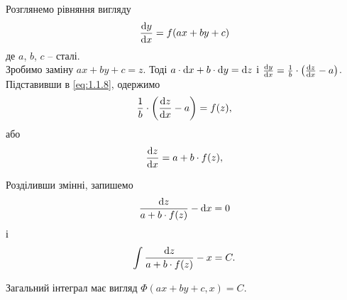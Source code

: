Розглянемо рівняння вигляду
\begin{equation}
	\label{eq:1.1.8}
	\frac{\mathop{}\!\mathrm{d} y}{\mathop{}\!\mathrm{d} x} = f(a x + b y + c)
\end{equation}
де $a$, $b$, $c$ -- сталі. \\

Зробимо заміну $a x + b y + c = z$. Тоді $a \cdot \mathop{}\!\mathrm{d} x + b \cdot \mathop{}\!\mathrm{d} y = \mathop{}\!\mathrm{d} z$ і $\frac{\mathop{}\!\mathrm{d} y}{\mathop{}\!\mathrm{d} x} = \frac1b \cdot \left( \frac{\mathop{}\!\mathrm{d} z}{\mathop{}\!\mathrm{d} x} - a \right)$. \\

Підставивши в \eqref{eq:1.1.8}, одержимо
\begin{equation}
	\label{eq:1.1.9}
	\frac1b \cdot \left( \frac{\mathop{}\!\mathrm{d} z}{\mathop{}\!\mathrm{d} x} - a \right) = f(z),
\end{equation}
або
\begin{equation}
	\label{eq:1.1.10}
	\frac{\mathop{}\!\mathrm{d} z}{\mathop{}\!\mathrm{d} x} = a + b \cdot f (z),
\end{equation}

Розділивши змінні, запишемо
\begin{equation}
	\label{eq:1.1.11}
	\frac{\mathop{}\!\mathrm{d} z}{a + b \cdot f (z)} - \mathop{}\!\mathrm{d} x = 0
\end{equation}
і
\begin{equation}
	\label{eq:1.1.12}
	\int \frac{\mathop{}\!\mathrm{d} z}{a + b \cdot f (z)} - x = C.
\end{equation}

Загальний інтеграл має вигляд $\Phi(a x + b y + c, x) = C$.